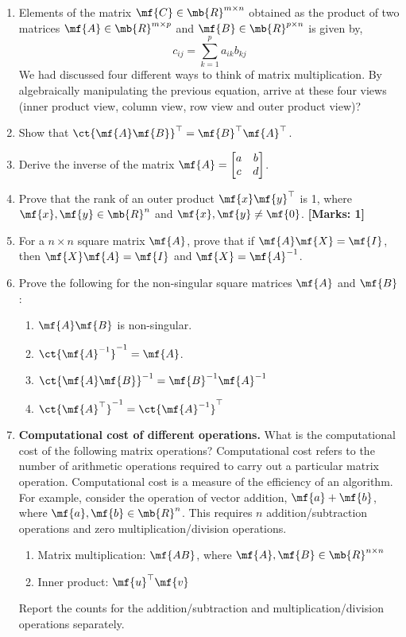 \begin{enumerate}
    \item Elements of the matrix $\mf{C} \in \mb{R}^{m \times n}$ obtained as the product of two matrices $\mf{A} \in \mb{R}^{m \times p}$ and $\mf{B} \in \mb{R}^{p \times n}$ is given by,
    \[ c_{ij} = \sum_{k=1}^{p}a_{ik}b_{kj} \]
    We had discussed four different ways to think of matrix multiplication. By algebraically manipulating the previous equation, arrive at these four views (inner product view, column view, row view and outer product view)?
    
    \item Show that $\ct{\mf{A}\mf{B}}^\top = \mf{B}^\top\mf{A}^\top$.
    
    \item Derive the inverse of the matrix $\mf{A} = \begin{bmatrix}a & b\\c & d\end{bmatrix}$.

    \item Prove that the rank of an outer product $\mf{x}\mf{y}^\top$ is 1, where $\mf{x},\mf{y} \in \mb{R}^n$ and $\mf{x}, \mf{y} \neq \mf{0}$.  \textbf{[Marks: 1]}
    
    \item For a $n \times n$ square matrix $\mf{A}$, prove that if $\mf{A}\mf{X} = \mf{I}$, then $\mf{X}\mf{A} = \mf{I}$ and $\mf{X} = \mf{A}^{-1}$.

    \item Prove the following for the non-singular square matrices $\mf{A}$ and $\mf{B}$:
    \begin{enumerate}
        \item $\mf{A}\mf{B}$ is non-singular.
        \item $\ct{\mf{A}^{-1}}^{-1} = \mf{A}$.
        \item $\ct{\mf{A}\mf{B}}^{-1} = \mf{B}^{-1}\mf{A}^{-1}$
        \item $\ct{\mf{A}^\top}^{-1} = \ct{\mf{A}^{-1}}^\top$
    \end{enumerate}
    
    \item \textbf{Computational cost of different operations.} What is the computational cost of the following matrix operations? Computational cost refers to the number of arithmetic operations  required to carry out a particular matrix operation. Computational cost is a measure of the efficiency of an algorithm. For example, consider the operation of vector addition, $\mf{a} + \mf{b}$, where $\mf{a}, \mf{b} \in \mb{R}^n$. This requires $n$ addition/subtraction operations and zero multiplication/division operations.
    \begin{enumerate}
        \item Matrix multiplication: $\mf{AB}$, where $\mf{A}, \mf{B} \in \mb{R}^{n \times n}$
        \item Inner product: $\mf{u}^\top\mf{v}$
    \end{enumerate} 
    Report the counts for the addition/subtraction and multiplication/division operations separately.
    

\end{enumerate}
